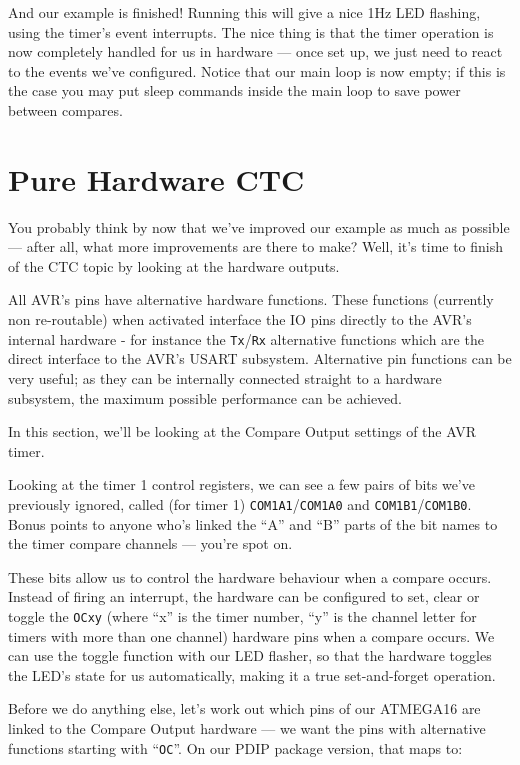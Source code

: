 \documentclass[a4paper,oneside,notitlepage]{book}
\begin{document}
And our example is finished! Running this will give a nice 1Hz LED flashing, using the timer's event interrupts. The nice thing is that the timer operation is now completely handled for us in hardware --- once set up, we just need to react to the events we've configured. Notice that our main loop is now empty; if this is the case you may put sleep commands inside the main loop to save power between compares. 


\label{chp:HWCTC}
\chapter{Pure Hardware CTC}

You probably think by now that we've improved our example as much as possible --- after all, what more improvements are there to make? Well, it's time to finish of the CTC topic by looking at the hardware outputs.

All AVR's pins have alternative hardware functions. These functions (currently non re-routable) when activated interface the IO pins directly to the AVR's internal hardware - for instance the \texttt{Tx}/\texttt{Rx} alternative functions which are the direct interface to the AVR's USART subsystem. Alternative pin functions can be very useful; as they can be internally connected straight to a hardware subsystem, the maximum possible performance can be achieved.

In this section, we'll be looking at the Compare Output settings of the AVR timer.

Looking at the timer 1 control registers, we can see a few pairs of bits we've previously ignored, called (for timer 1) \texttt{COM1A1}/\texttt{COM1A0} and \texttt{COM1B1}/\texttt{COM1B0}. Bonus points to anyone who's linked the ``A'' and ``B'' parts of the bit names to the timer compare channels --- you're spot on.

These bits allow us to control the hardware behaviour when a compare occurs. Instead of firing an interrupt, the hardware can be configured to set, clear or toggle the \texttt{OCxy} (where ``x'' is the timer number, ``y'' is the channel letter for timers with more than one channel) hardware pins when a compare occurs. We can use the toggle function with our LED flasher, so that the hardware toggles the LED's state for us automatically, making it a true set-and-forget operation.

Before we do anything else, let's work out which pins of our ATMEGA16 are linked to the Compare Output hardware --- we want the pins with alternative functions starting with ``\texttt{OC}''. On our PDIP package version, that maps to: 
\end{document}

